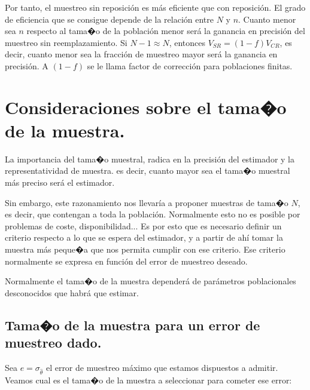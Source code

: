 Por tanto, el muestreo sin reposici\'on es m\'as eficiente que con reposici\'on.
El grado de eficiencia que se consigue depende de la relaci\'on entre
$N$ y $n$. Cuanto menor sea $n$ respecto al tama�o de la poblaci\'on
menor ser\'a la ganancia en precisi\'on del muestreo sin reemplazamiento.
Si $N-1\approx N$, entonces $V_{SR}=\left(1-f\right)V_{CR}$, es
decir, cuanto menor sea la fracci\'on de muestreo mayor ser\'a la ganancia
en precisi\'on. A $\left(1-f\right)$ se le llama factor de correcci\'on
para poblaciones finitas.


\section{Consideraciones sobre el tama�o de la muestra.}

La importancia del tama�o muestral, radica en la precisi\'on del estimador
y la representatividad de muestra. es decir, cuanto mayor sea el tama�o
muestral m\'as preciso ser\'a el estimador.

Sin embargo, este razonamiento nos llevar\'ia a proponer muestras de
tama�o $N$, es decir, que contengan a toda la poblaci\'on. Normalmente
esto no es posible por problemas de coste, disponibilidad... Es por
esto que es necesario definir un criterio respecto a lo que se espera
del estimador, y a partir de ah\'i tomar la muestra m\'as peque�a que
nos permita cumplir con ese criterio. Ese criterio normalmente se
expresa en funci\'on del error de muestreo deseado.

Normalmente el tama�o de la muestra depender\'a de par\'ametros poblacionales
desconocidos que habr\'a que estimar.


\subsection{Tama�o de la muestra para un error de muestreo dado.}

Sea $e=\sigma_{\hat{\theta}}$ el error de muestreo m\'aximo que estamos
dispuestos a admitir. Veamos cual es el tama�o de la muestra a seleccionar
para cometer ese error:



